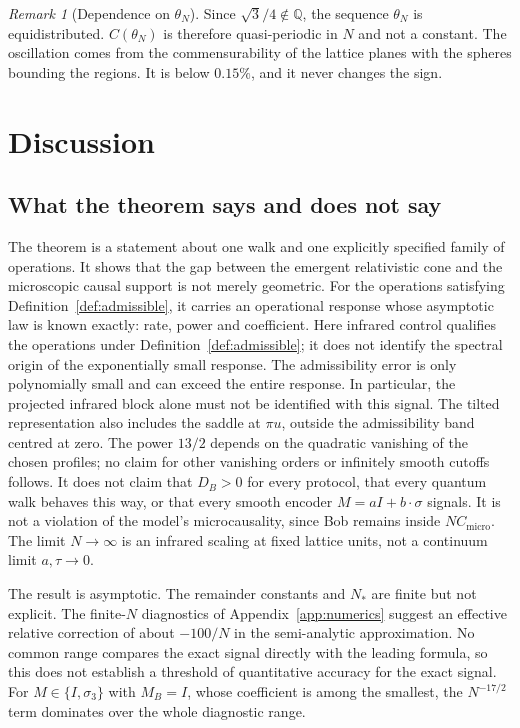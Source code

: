 \documentclass[11pt]{amsart}
\theoremstyle{definition}
\theoremstyle{remark}
\newtheorem{remark}[theorem]{Remark}
\newcommand{\Cmicro}{C_{\mathrm{micro}}}
\begin{document}
\begin{remark}[Dependence on $\theta_N$]
Since $\sqrt3/4\notin\mathbb Q$, the sequence $\theta_N$ is equidistributed.
$C(\theta_N)$ is therefore quasi-periodic in $N$ and not a constant.  The
oscillation comes from the commensurability of the lattice planes with the
spheres bounding the regions.  It is below $0.15\%$, and it never changes
the sign.
\end{remark}

\section{Discussion}\label{sec:discussion}

\subsection{What the theorem says and does not say}
The theorem is a statement about one walk and one explicitly specified
family of operations.  It shows that the gap between the emergent
relativistic cone and the microscopic causal support is not merely
geometric. For the operations satisfying Definition~\ref{def:admissible}, it carries an
operational response whose asymptotic law is known exactly: rate, power
and coefficient. Here infrared control qualifies the operations under
Definition~\ref{def:admissible}; it does not identify the spectral origin
of the exponentially small response. The admissibility error is only
polynomially small and can exceed the entire response. In particular, the
projected infrared block alone must not be identified with this signal.
The tilted representation also includes the saddle at $\pi u$, outside
the admissibility band centred at zero. The power $13/2$ depends on the
quadratic vanishing of the chosen profiles; no claim for other vanishing
orders or infinitely smooth cutoffs follows.
It does not claim that $D_B>0$ for every protocol, that
every quantum walk behaves this way, or that every smooth encoder
$M=aI+b\cdot\sigma$ signals.  It is not a violation of the model's
microcausality, since Bob remains inside $N\Cmicro$.  The limit
$N\to\infty$ is an infrared scaling at fixed lattice units, not a continuum
limit $a,\tau\to0$.

The result is asymptotic.  The remainder constants and $N_*$ are finite but
not explicit.  The finite-$N$ diagnostics of Appendix~\ref{app:numerics}
suggest an effective relative correction of about $-100/N$ in the
semi-analytic approximation. No common range compares the exact signal
directly with the leading formula, so this does not establish a threshold
of quantitative accuracy for the exact signal. For
$M\in\{I,\sigma_3\}$ with $M_B=I$, whose coefficient is among the smallest,
the $N^{-17/2}$ term dominates over the whole diagnostic range.
\end{document}
